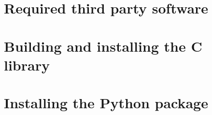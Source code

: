 


\section{Required third party software}

\section{Building and installing the C library}

\section{Installing the Python package}
